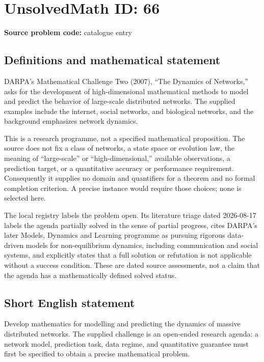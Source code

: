 \documentclass[11pt]{article}
\begin{document}
\section*{UnsolvedMath ID: 66}
\textbf{Source problem code:} catalogue entry
\subsection{Definitions and mathematical statement}
DARPA's Mathematical Challenge Two (2007), ``The Dynamics of Networks,'' asks for the development of high-dimensional mathematical methods to model and predict the behavior of large-scale distributed networks. The supplied examples include the internet, social networks, and biological networks, and the background emphasizes network dynamics.

This is a research programme, not a specified mathematical proposition. The source does not fix a class of networks, a state space or evolution law, the meaning of ``large-scale'' or ``high-dimensional,'' available observations, a prediction target, or a quantitative accuracy or performance requirement. Consequently it supplies no domain and quantifiers for a theorem and no formal completion criterion. A precise instance would require those choices; none is selected here.

The local registry labels the problem open. Its literature triage dated 2026-08-17 labels the agenda partially solved in the sense of partial progress, cites DARPA's later Models, Dynamics and Learning programme as pursuing rigorous data-driven models for non-equilibrium dynamics, including communication and social systems, and explicitly states that a full solution or refutation is not applicable without a success condition. These are dated source assessments, not a claim that the agenda has a mathematically defined solved status.
\subsection{Short English statement}
Develop mathematics for modelling and predicting the dynamics of massive distributed networks. The supplied challenge is an open-ended research agenda: a network model, prediction task, data regime, and quantitative guarantee must first be specified to obtain a precise mathematical problem.
\end{document}

